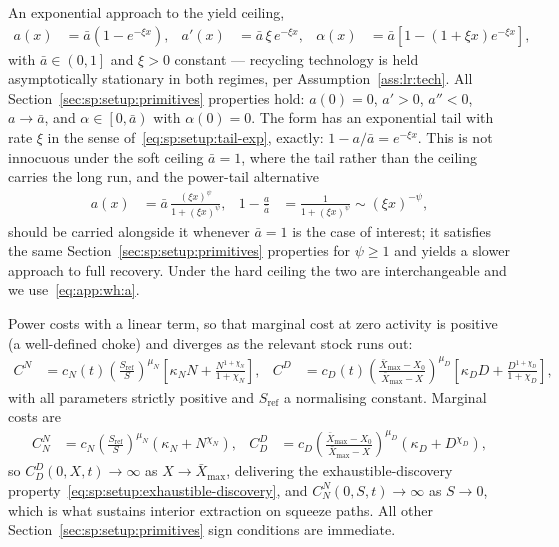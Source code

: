  An exponential approach to the yield ceiling,
\begin{align}
a\left(x\right) &= \bar a\left(1-e^{-\xi x}\right),
&
a'\left(x\right) &= \bar a\,\xi\,e^{-\xi x},
&
\alpha\left(x\right) &= \bar a\left[1-\left(1+\xi x\right)e^{-\xi x}\right],
\label{eq:app:wh:a}
\end{align}
with $\bar a\in\left(0,1\right]$ and $\xi>0$ constant --- recycling technology is held asymptotically stationary in both regimes, per Assumption~\ref{ass:lr:tech}. All Section~\ref{sec:sp:setup:primitives} properties hold: $a\left(0\right)=0$, $a'>0$, $a''<0$, $a\to\bar a$, and $\alpha\in\left[0,\bar a\right)$ with $\alpha\left(0\right)=0$. The form has an exponential tail with rate $\xi$ in the sense of~\eqref{eq:sp:setup:tail-exp}, exactly: $1-a/\bar a=e^{-\xi x}$. This is not innocuous under the soft ceiling $\bar a=1$, where the tail rather than the ceiling carries the long run, and the power-tail alternative
\begin{align}
a\left(x\right) &= \bar a\,\frac{\left(\xi x\right)^{\psi}}{1+\left(\xi x\right)^{\psi}},
&
1-\frac{a}{\bar a} &= \frac{1}{1+\left(\xi x\right)^{\psi}}\sim\left(\xi x\right)^{-\psi},
\label{eq:app:wh:a-power}
\end{align}
should be carried alongside it whenever $\bar a=1$ is the case of interest; it satisfies the same
Section~\ref{sec:sp:setup:primitives} properties for $\psi\ge1$ and yields a slower approach to full
recovery. Under the hard ceiling the two are interchangeable and we use~\eqref{eq:app:wh:a}.

 Power costs with a linear term, so that marginal cost at zero activity is positive (a well-defined choke) and diverges as the relevant stock runs out:
\begin{align}
C^N &= c_N(t)\left(\frac{S_{\mathrm{ref}}}{S}\right)^{\mu_N}\left[\kappa_N N+\frac{N^{1+\chi_N}}{1+\chi_N}\right],
&
C^D &= c_D(t)\left(\frac{\bar X_{\max}-X_0}{\bar X_{\max}-X}\right)^{\mu_D}\left[\kappa_D D+\frac{D^{1+\chi_D}}{1+\chi_D}\right],
\label{eq:app:wh:costs}
\end{align}
with all parameters strictly positive and $S_{\mathrm{ref}}$ a normalising constant. Marginal costs are
\begin{align}
C^N_N &= c_N\left(\frac{S_{\mathrm{ref}}}{S}\right)^{\mu_N}\left(\kappa_N+N^{\chi_N}\right),
&
C^D_D &= c_D\left(\frac{\bar X_{\max}-X_0}{\bar X_{\max}-X}\right)^{\mu_D}\left(\kappa_D+D^{\chi_D}\right),
\label{eq:app:wh:mc}
\end{align}
so $C^D_D\left(0,X,t\right)\to\infty$ as $X\to\bar X_{\max}$, delivering the exhaustible-discovery property~\eqref{eq:sp:setup:exhaustible-discovery}, and $C^N_N\left(0,S,t\right)\to\infty$ as $S\to0$, which is what sustains interior extraction on squeeze paths. All other Section~\ref{sec:sp:setup:primitives} sign conditions are immediate.


